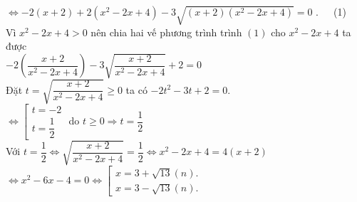\begin{ex}
{\begin{enumerate}
$ \Leftrightarrow - 2(x + 2) + 2(x^2 - 2x + 4) - 3\sqrt {(x + 2)({x^2} - 2x + 4)}  = 0$ .~~~(1)\\
Vì $x^2 - 2x + 4 > 0$ nên chia hai vế phương trình trình $(1)$ cho $x^2 - 2x + 4$  ta được\\
$ - 2\left( {\dfrac{x + 2}{x^2 - 2x + 4}} \right) - 3\sqrt {\dfrac{x + 2}{x^2 - 2x + 4}}  + 2 = 0$\\
Đặt $t = \sqrt {\dfrac{x + 2}{x^2 - 2x + 4}}  \ge 0$  ta có $ - 2t^2 - 3t + 2 = 0$.\\
$ \Leftrightarrow \left[ \begin{array}{l}
t =  - 2\\
t = \dfrac{1}{2}
\end{array} \right.$
do $t\geq 0 \Rightarrow t=\dfrac{1}{2} $\\
Với $t = \dfrac{1}{2} \Leftrightarrow \sqrt {\dfrac{x + 2}{x^2 - 2x + 4}}  = \dfrac{1}{2} \Leftrightarrow x^2 - 2x + 4 = 4(x + 2)$\\
$\Leftrightarrow x^2 - 6x - 4 = 0 \Leftrightarrow \left[ \begin{array}{l}
x = 3 + \sqrt {13} \left( n \right).\\
x = 3 - \sqrt {13} \left( n \right).
\end{array} \right.$
    \end{enumerate}
    }
\end{ex}

